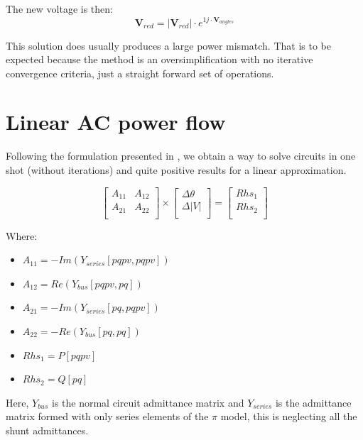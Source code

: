 \documentclass[a4paper,twoside,fleqn]{tufte-book}
\begin{document}
The new voltage is then:
\begin{equation}
\textbf{V}_{red} = |\textbf{V}_{red}| \cdot e^{1j \cdot  \textbf{V}_{angles}}
\end{equation}

This solution does usually produces a large power mismatch. That is to be expected because the method is an oversimplification with no iterative convergence criteria, just a straight forward set of operations.


\section{Linear AC power flow}

Following the formulation presented in \cite{rossoni2016linearized}, we obtain a way to solve circuits in one shot (without iterations) and quite positive results for a linear approximation.

\begin{equation}
\begin{bmatrix}
A_{11} & A_{12} \\
A_{21} & A_{22} \\
\end{bmatrix}
\times
\begin{bmatrix}
\Delta \theta\\
\Delta |V|\\
\end{bmatrix}
=
\begin{bmatrix}
Rhs_1\\
Rhs_2\\
\end{bmatrix}
\end{equation}

Where:
\begin{itemize}
	\item $A_{11} = -Im\left(Y_{series}[pqpv, pqpv]\right)$
	\item $A_{12} = Re\left(Y_{bus}[pqpv, pq]\right)$
	\item $A_{21} = -Im\left(Y_{series}[pq, pqpv]\right)$
	\item $A_{22} = -Re\left(Y_{bus}[pq, pq]\right)$
	\item $Rhs_1 = P[pqpv]$
	\item $Rhs_2 = Q[pq]$\newline
\end{itemize}

Here, $Y_{bus}$ is the normal circuit admittance matrix and $Y_{series}$ is the admittance matrix formed with only series elements of the $\pi$ model, this is neglecting all the shunt admittances.
\end{document}

